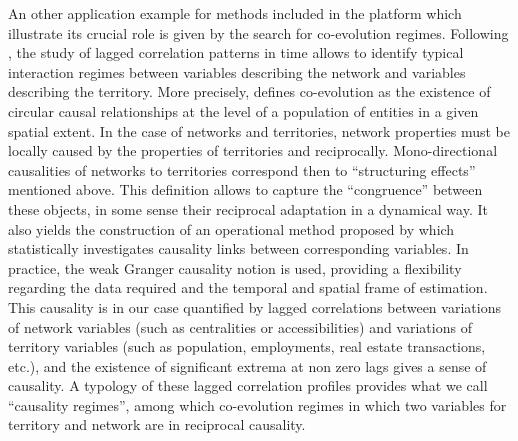 \documentclass[10pt]{article}
\begin{document}
An other application example for methods included in the platform which illustrate its crucial role is given by the search for co-evolution regimes. Following \cite{raimbault2017identification}, the study of lagged correlation patterns in time allows to identify typical interaction regimes between variables describing the network and variables describing the territory. More precisely, \cite{raimbault2018modelisation} defines co-evolution as the existence of circular causal relationships at the level of a population of entities in a given spatial extent. In the case of networks and territories, network properties must be locally caused by the properties of territories and reciprocally. Mono-directional causalities of networks to territories correspond then to ``structuring effects'' mentioned above. This definition allows to capture the ``congruence'' \cite{offner1993effets} between these objects, in some sense their reciprocal adaptation in a dynamical way. It also yields the construction of an operational method proposed by \cite{raimbault2017identification} which statistically investigates causality links between corresponding variables. In practice, the weak Granger causality notion is used, providing a flexibility regarding the data required and the temporal and spatial frame of estimation. This causality is in our case quantified by lagged correlations between variations of network variables (such as centralities or accessibilities) and variations of territory variables (such as population, employments, real estate transactions, etc.), and the existence of significant extrema at non zero lags gives a sense of causality. A typology of these lagged correlation profiles provides what we call ``causality regimes'', among which co-evolution regimes in which two variables for territory and network are in reciprocal causality.
\end{document}
